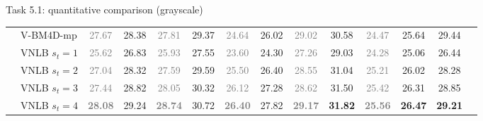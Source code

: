 \documentclass[mathserif, 8pt]{beamer}
\newcommand{\bsic}[1]{\textcolor{gray}{#1}}
\newcommand{\Bsic}[1]{\textcolor{gray}{\textbf{#1}}}
\newcommand{\Best}[1]{\textbf{\textcolor{MyOrangeBrighter}{#1}}}
\begin{document}
\begin{frame}{Task 5.1: quantitative comparison (grayscale)}
\begin{center}
{\begin{tabular}{ c | l |c c | c c | c c | c c | c c | c c}
			                      & V-BM4D-mp            & \bsic{27.67} &       28.38  & \bsic{27.81} &       29.37   & \bsic{24.64} &       26.02  & \bsic{29.02} &       30.58   & \bsic{24.47} &       25.64  &  29.44  \\
			                      & VNLB   $s_t = 1$     & \bsic{25.62} &       26.83  & \bsic{25.93} &       27.55   & \bsic{23.60} &       24.30  & \bsic{27.26} &       29.03   & \bsic{24.28} &       25.06  &       26.44  \\
			                      & VNLB   $s_t = 2$     & \bsic{27.04} &       28.32  & \bsic{27.59} &       29.59   & \bsic{25.50} &       26.40  & \bsic{28.55} &       31.04   & \bsic{25.21} &       26.02  &       28.28  \\
			                      & VNLB   $s_t = 3$     & \bsic{27.44} &       28.82  & \bsic{28.05} &       30.32   & \bsic{26.12} &       27.28  & \bsic{28.62} &       31.50   & \bsic{25.42} &       26.31  &       28.85  \\
			                      & VNLB   $s_t = 4$     & \Bsic{28.08} &       29.24  & \Bsic{28.74} &       30.72   & \Bsic{26.40} &       27.82  & \Bsic{29.17} & \Best{31.82}  & \Bsic{25.56} & \Best{26.47} & \Best{29.21} \\\hline
		\end{tabular}}
		\medskip
	\end{center}


\end{frame}
\end{document}
